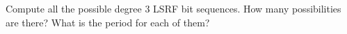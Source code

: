  Compute all the possible degree 3 LSRF bit sequences.
  How many possibilities are there?
  What is the period for each of them?
